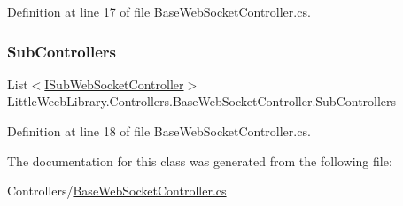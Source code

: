 Definition at line 17 of file Base\+Web\+Socket\+Controller.\+cs.

\mbox{\label{class_little_weeb_library_1_1_controllers_1_1_base_web_socket_controller_a73de333945e3c5cbba6976077e62d61c}} 
\subsubsection{\texorpdfstring{Sub\+Controllers}{SubControllers}}
{\footnotesize\ttfamily List$<$\mbox{\hyperlink{interface_little_weeb_library_1_1_controllers_1_1_i_sub_web_socket_controller}{I\+Sub\+Web\+Socket\+Controller}}$>$ Little\+Weeb\+Library.\+Controllers.\+Base\+Web\+Socket\+Controller.\+Sub\+Controllers\hspace{0.3cm}{\ttfamily [private]}}



Definition at line 18 of file Base\+Web\+Socket\+Controller.\+cs.



The documentation for this class was generated from the following file\+:\begin{DoxyCompactItemize}
\item 
Controllers/\mbox{\hyperlink{_base_web_socket_controller_8cs}{Base\+Web\+Socket\+Controller.\+cs}}\end{DoxyCompactItemize}
